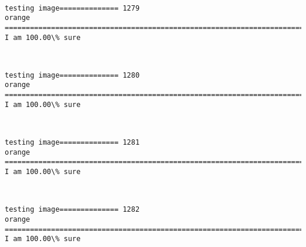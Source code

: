 \documentclass[11pt]{article}
\begin{document}
    \begin{center}
    \end{center}
    { \hspace*{\fill} \\}
    
    \begin{Verbatim}[commandchars=\\\{\}]
testing image============== 1279
orange
============================================================================
I am 100.00\% sure

    \end{Verbatim}

    \begin{center}
    \end{center}
    { \hspace*{\fill} \\}
    
    \begin{Verbatim}[commandchars=\\\{\}]
testing image============== 1280
orange
============================================================================
I am 100.00\% sure

    \end{Verbatim}

    \begin{center}
    \end{center}
    { \hspace*{\fill} \\}
    
    \begin{Verbatim}[commandchars=\\\{\}]
testing image============== 1281
orange
============================================================================
I am 100.00\% sure

    \end{Verbatim}

    \begin{center}
    \end{center}
    { \hspace*{\fill} \\}
    
    \begin{Verbatim}[commandchars=\\\{\}]
testing image============== 1282
orange
============================================================================
I am 100.00\% sure

    \end{Verbatim}
\end{document}
